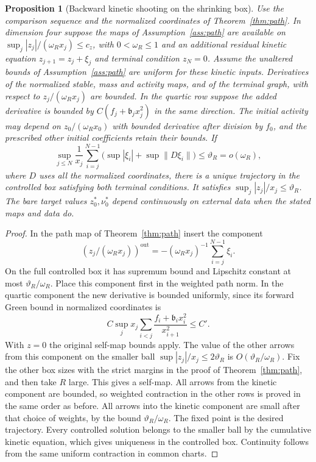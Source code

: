\documentclass[11pt]{article}
\newtheorem{proposition}[theorem]{Proposition}
\theoremstyle{definition}
\begin{document}
\begin{proposition}[Backward kinetic shooting on the shrinking box]
\label{prop:kinetic-backward}
Use the comparison sequence and the normalized coordinates of
Theorem~\ref{thm:path}. In dimension four suppose the maps of
Assumption~\ref{ass:path} are available on
\(\sup_j |z_j|/(\omega_R x_j)\le c_z\), with
\(0<\omega_R\le 1\) and an additional residual kinetic
equation \(z_{j+1}=z_j+\xi_j\) and terminal condition \(z_N=0\).
Assume the unaltered bounds of Assumption~\ref{ass:path} are
uniform for these kinetic inputs. Derivatives of the normalized
stable, mass and activity maps, and of the terminal graph, with
respect to \(z_j/(\omega_R x_j)\) are bounded. In the quartic row suppose
the added derivative is bounded by
\(C(f_j+\mathfrak b_j x_j^2)\) in the same direction. The initial
activity may depend on \(z_0/(\omega_R x_0)\) with bounded derivative after
division by \(f_0\), and the prescribed other initial coefficients
retain their bounds. If
\begin{equation}
 \sup_{j\le N}\frac1{x_j}\sum_{i=j}^{N-1}
       \bigl(\sup |\xi_i|+\sup\|D\xi_i\|\bigr)
 \le \vartheta_R=o(\omega_R),
\end{equation}
where \(D\) uses all the normalized coordinates, there is a
unique trajectory in the controlled box satisfying both terminal
conditions. It satisfies
\(\sup_j |z_j|/x_j\le\vartheta_R\).
The bare target values \(z_0^*,\nu_0^*\) depend continuously
on external data when the stated maps and data do.
\end{proposition}

\begin{proof}
In the path map of Theorem~\ref{thm:path} insert the component
\begin{equation}
 (z_j/(\omega_R x_j))^{\mathrm{out}}
       = -(\omega_R x_j)^{-1}\sum_{i=j}^{N-1}\xi_i .
\end{equation}
On the full controlled box it has supremum bound and Lipschitz
constant at most \(\vartheta_R/\omega_R\). Place this component first in
the weighted path norm. In the quartic component the new
derivative is bounded uniformly, since its forward Green
bound in normalized coordinates is
\begin{equation}
 C\sup_j x_j\sum_{i<j}
        \frac{f_i+\mathfrak b_i x_i^2}{x_{i+1}^2}\le C'.
\end{equation}
With \(z=0\) the original self-map bounds apply. The value
of the other arrows from this component on the smaller ball
\(\sup |z_j|/x_j\le 2\vartheta_R\) is
\(O(\vartheta_R/\omega_R)\).
Fix the other box sizes with the strict margins in the proof
of Theorem~\ref{thm:path}, and then take \(R\) large. This
gives a self-map. All arrows from the kinetic component
are bounded, so weighted contraction in the other rows
is proved in the same order as before. All arrows into the
kinetic component are small after that choice of weights,
by the bound \(\vartheta_R/\omega_R\). The fixed point is the desired
trajectory. Every controlled solution belongs to the smaller
ball by the cumulative kinetic equation, which gives uniqueness
in the controlled box. Continuity follows from the same
uniform contraction in common charts.
\end{proof}
\end{document}
